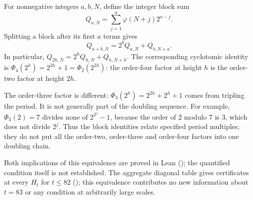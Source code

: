 \begin{thm}\label{thm:concatenation-specified-period-multiples}
For nonnegative integers $a,b,N$, define the integer block sum
\[
 Q_{a,N}=\sum_{j=1}^{a}\varphi(N+j)2^{a-j}.
\]
Splitting a block after its first $a$ terms gives
\[
 Q_{a+b,N}=2^bQ_{a,N}+Q_{b,N+a}.
\]
In particular, $Q_{2h,N}=2^hQ_{h,N}+Q_{h,N+h}$.
The corresponding cyclotomic identity is
$\Phi_4(2^h)=2^{2h}+1=\Phi_2(2^{2h})$: the order-four factor at height
$h$ is the order-two factor at height $2h$.

The order-three factor is different:
$\Phi_3(2^h)=2^{2h}+2^h+1$ comes from tripling the period.
It is not generally part of the doubling sequence. For example,
$\Phi_3(2)=7$ divides none of $2^{2^j}-1$, because the order of $2$
modulo $7$ is $3$, which does not divide $2^j$. Thus the block identities
relate specified period multiples; they do not put all the order-two,
order-three and order-four factors into one doubling chain.
\end{thm}

\begin{obs}
Both implications of this equivalence are proved in Lean
();
the quantified condition itself is not established. The aggregate diagonal
table gives certificates at every $H_t$ for $t\le82$
();
this equivalence contributes no new information about $t=83$ or any
condition at arbitrarily large scales.
\end{obs}

